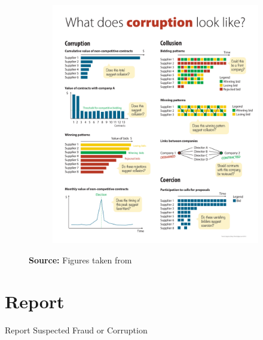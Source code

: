 \begin{figure}[H]
\begin{subfigure}[t]{0.5\textwidth}
\includegraphics[max width=1\textwidth]{../img/poster_win_pattern.pdf}
\end{subfigure}
\footnotesize{\textbf{Source:} Figures taken from \cite{wb_poster}}
\end{figure}



\section{Report}
Report Suspected Fraud or Corruption






